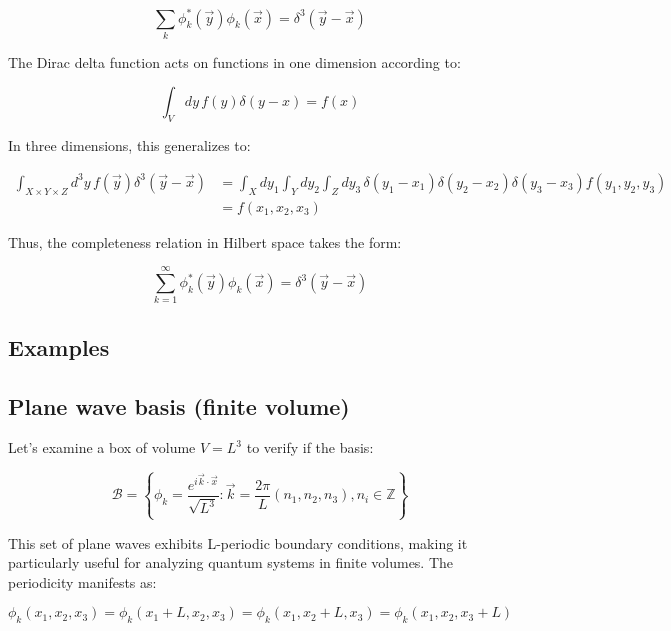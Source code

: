 \documentclass[italian]{HKNdocument}
\begin{document}
\begin{equation}
\sum_k \phi_k^*(\vec{y})\phi_k(\vec{x}) = \delta^3(\vec{y}-\vec{x}) \label{eq:4.30}
\end{equation}

The Dirac delta function acts on functions in one dimension according to:

\begin{equation}
\int_V dy\, f(y)\delta(y-x) = f(x) \label{eq:4.31}
\end{equation}

In three dimensions, this generalizes to:

\begin{align}
\int_{X \times Y \times Z} d^3y\, f(\vec{y})\delta^3(\vec{y}-\vec{x}) &= \int_X dy_1 \int_Y dy_2 \int_Z dy_3\, \delta(y_1-x_1)\delta(y_2-x_2)\delta(y_3-x_3)f(y_1,y_2,y_3) \\
&= f(x_1,x_2,x_3) \label{eq:4.32}
\end{align}

Thus, the completeness relation in Hilbert space takes the form:

\begin{equation}
\sum_{k=1}^{\infty} \phi_k^*(\vec{y})\phi_k(\vec{x}) = \delta^3(\vec{y}-\vec{x}) \label{eq:4.33}
\end{equation}

\subsection{Examples}
\subsection{Plane wave basis (finite volume)}
Let's examine a box of volume $V = L^3$ to verify if the basis:


\begin{equation}
\mathcal{B} = \left\{\phi_k = \frac{e^{i\vec{k}\cdot\vec{x}}}{\sqrt{L^3}}: \vec{k} = \frac{2\pi}{L}(n_1, n_2, n_3), n_i \in \mathbb{Z}\right\} \label{eq:4.34}
\end{equation}

This set of plane waves exhibits L-periodic boundary conditions, making it particularly useful for analyzing quantum systems in finite volumes. The periodicity manifests as:

\begin{equation}
\phi_k(x_1, x_2, x_3) = \phi_k(x_1+L, x_2, x_3) = \phi_k(x_1, x_2+L, x_3) = \phi_k(x_1, x_2, x_3+L) \label{eq:4.35}
\end{equation}
\end{document}
